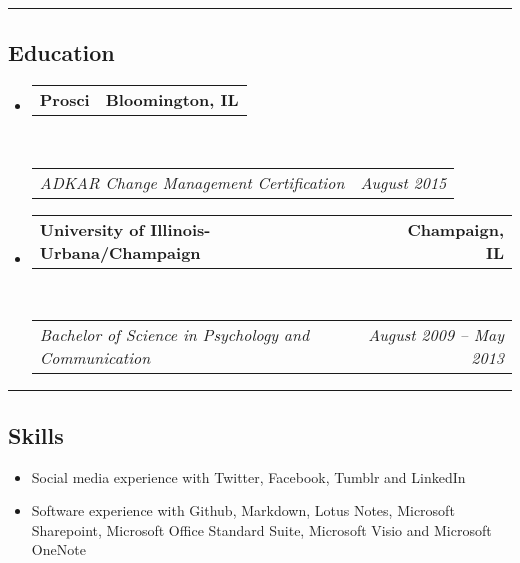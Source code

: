 \documentclass[10pt,letterpaper]{article}
\makeatletter
\newcommand{\headerrow}[2]
{\begin{tabular*}{\linewidth}{l@{\extracolsep{\fill}}r}
	#1 &
	#2 \\
\end{tabular*}}
\makeatother
\begin{document}
\hrule
\vspace{-0.4em}
\subsection*{Education}

\begin{itemize}
	\parskip=0.1em

	\item
	\headerrow
		{\textbf{Prosci}}
		{\textbf{Bloomington, IL}}
	\\
	\headerrow
		{\emph{ADKAR Change Management Certification}}
		{\emph{August 2015}}

	\item
	\headerrow
		{\textbf{University of Illinois-Urbana/Champaign}}
		{\textbf{Champaign, IL}}
	\\
	\headerrow
		{\emph{Bachelor of Science in Psychology and Communication}}
		{\emph{August 2009 -- May 2013}}

\end{itemize}

\hrule
\vspace{-0.4em}
\subsection*{Skills}

\begin{itemize}
	\item Social media experience with Twitter, Facebook, Tumblr and LinkedIn
        \item Software experience with Github, Markdown, Lotus Notes, Microsoft Sharepoint, Microsoft Office Standard Suite, Microsoft
        Visio and Microsoft OneNote
\end{itemize}
\end{document}
